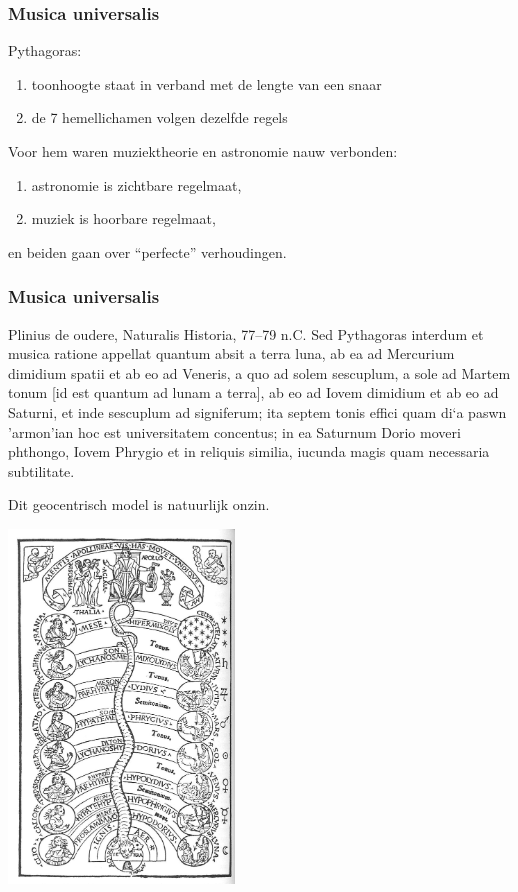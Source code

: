 \documentclass[compress, darktitle, framenumber, handout, totalframenumber]{beamer}
\begin{document}
\begin{frame}[label=history]
  \frametitle{Musica universalis}

  Pythagoras:
  \begin{enumerate}
    \item toonhoogte staat in verband met de lengte van een snaar
    \item de 7 hemellichamen volgen dezelfde regels
  \end{enumerate}

  \pause
  Voor hem waren muziektheorie en astronomie nauw verbonden:
  \begin{enumerate}
    \item astronomie is \alert{zichtbare} regelmaat,
    \item muziek is \alert{hoorbare} regelmaat,
  \end{enumerate}
  en beiden gaan over \alert{``perfecte'' verhoudingen}.
\end{frame}

\begin{frame}
  \frametitle{Musica universalis}

  \begin{block}{Plinius de oudere, Naturalis Historia, 77--79 n.C.}
    Sed Pythagoras interdum et musica ratione appellat quantum absit a terra luna, ab ea ad Mercurium dimidium spatii et ab eo ad Veneris, a quo ad solem sescuplum, a sole ad Martem tonum [id est quantum ad lunam a terra], ab eo ad Iovem dimidium et ab eo ad Saturni, et inde sescuplum ad signiferum; ita septem tonis effici quam \greektext di`a paswn 'armon'ian \latintext hoc est universitatem concentus; in ea Saturnum Dorio moveri phthongo, Iovem Phrygio et in reliquis similia, iucunda magis quam necessaria subtilitate.
  \end{block}

  \pause

  Dit \alert{geocentrisch model} is natuurlijk onzin.
\end{frame}

\begin{frame}[plain]
  \centering
  \includegraphics[width=6cm]{images/spheres}
\end{frame}
\end{document}
